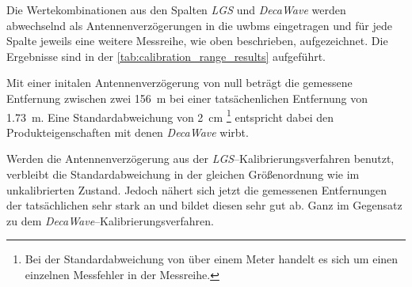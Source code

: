 Die Wertekombinationen aus den Spalten \textit{LGS} und \textit{DecaWave} werden abwechselnd als Antennenverzögerungen in die \Glspl{uwbm} eingetragen und für jede Spalte jeweils eine weitere Messreihe, wie oben beschrieben, aufgezeichnet. Die Ergebnisse sind in der \autoref{tab:calibration_range_results} aufgeführt.

Mit einer initalen Antennenverzögerung von null beträgt die gemessene Entfernung zwischen zwei  \approx \SI{156}{\meter} bei einer tatsächenlichen Entfernung von \approx \SI{1.73}{\meter}. Eine Standardabweichung von \approx \SI{2}{\centi\meter} \footnote{Bei der Standardabweichung von über einem Meter handelt es sich um einen einzelnen Messfehler in der Messreihe.} entspricht dabei den Produkteigenschaften mit denen \textit{DecaWave} wirbt.

Werden die Antennenverzögerung aus der \textit{LGS}--Kalibrierungsverfahren benutzt, verbleibt die Standardabweichung in der gleichen Größenordnung wie im unkalibrierten Zustand. Jedoch nähert sich jetzt die gemessenen Entfernungen der tatsächlichen sehr stark an und bildet diesen sehr gut ab. Ganz im Gegensatz zu dem \textit{DecaWave}--Ka\-li\-brie\-rungs\-ver\-fa\-hren.

